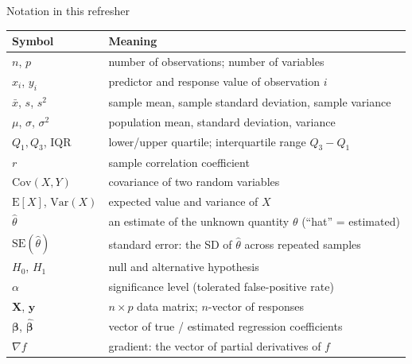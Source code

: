 \documentclass[aspectratio=169,11pt]{beamer}
\begin{document}
\begin{frame}{Notation in this refresher}
  \footnotesize
  \begin{center}
  \begin{tabular}{@{}ll@{}}
    \toprule
    \textbf{Symbol} & \textbf{Meaning} \\
    \midrule
    $n$, $p$ & number of observations; number of variables \\
    $x_i$, $y_i$ & predictor and response value of observation $i$ \\
    $\bar x$, $s$, $s^2$ & sample mean, sample standard deviation, sample variance \\
    $\mu$, $\sigma$, $\sigma^2$ & population mean, standard deviation, variance \\
    $Q_1, Q_3$, IQR & lower/upper quartile; interquartile range $Q_3-Q_1$ \\
    $r$ & sample correlation coefficient \\
    $\mathrm{Cov}(X,Y)$ & covariance of two random variables \\
    $\mathrm{E}[X]$, $\mathrm{Var}(X)$ & expected value and variance of $X$ \\
    $\hat\theta$ & an estimate of the unknown quantity $\theta$ (``hat'' = estimated) \\
    $\mathrm{SE}(\hat\theta)$ & standard error: the SD of $\hat\theta$ across repeated samples \\
    $H_0$, $H_1$ & null and alternative hypothesis \\
    $\alpha$ & significance level (tolerated false-positive rate) \\
    $\mathbf{X}$, $\mathbf{y}$ & $n\times p$ data matrix; $n$-vector of responses \\
    $\boldsymbol\beta$, $\hat{\boldsymbol\beta}$ & vector of true / estimated regression coefficients \\
    $\nabla f$ & gradient: the vector of partial derivatives of $f$ \\
    \bottomrule
  \end{tabular}
  \end{center}
\end{frame}
\end{document}
